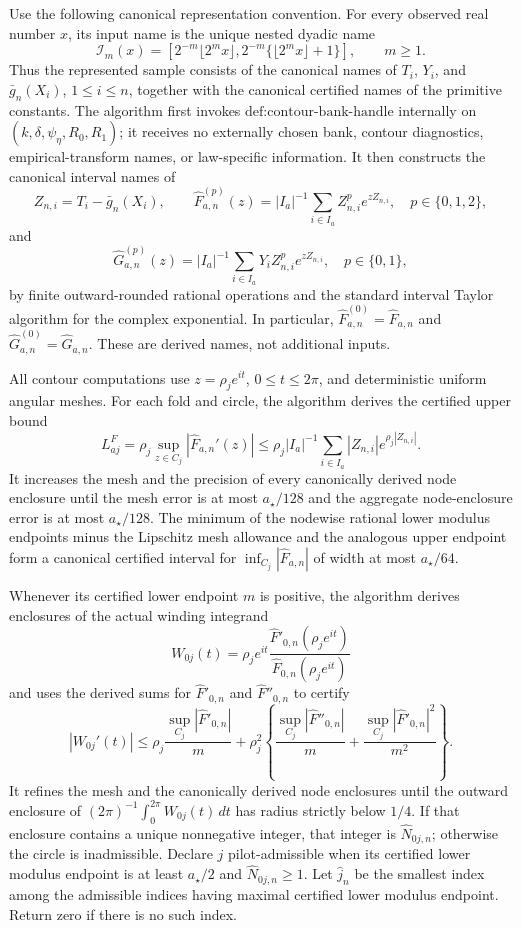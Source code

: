 Use the following canonical representation convention.  For every observed real number \(x\), its input name is the unique nested dyadic name
\[
 \mathcal I_m(x)=
 \left[2^{-m}\lfloor2^m x\rfloor,
       2^{-m}\{\lfloor2^m x\rfloor+1\}\right],
 \qquad m\ge1.
\]
Thus the represented sample consists of the canonical names of \(T_i\), \(Y_i\), and \(\bar g_n(X_i)\), \(1\le i\le n\), together with the canonical certified names of the primitive constants.  The algorithm first invokes \(\text{def:contour-bank-handle}\) internally on \((k,\delta,\psi_{\eta},R_0,R_1)\); it receives no externally chosen bank, contour diagnostics, empirical-transform names, or law-specific information.  It then constructs the canonical interval names of
\[
 Z_{n,i}=T_i-\bar g_n(X_i),
 \qquad
 \widehat F_{a,n}^{(p)}(z)
 =|I_a|^{-1}\sum_{i\in I_a}Z_{n,i}^{p}e^{zZ_{n,i}},
 \quad p\in\{0,1,2\},
\]
and
\[
 \widehat G_{a,n}^{(p)}(z)
 =|I_a|^{-1}\sum_{i\in I_a}Y_iZ_{n,i}^{p}e^{zZ_{n,i}},
 \quad p\in\{0,1\},
\]
by finite outward-rounded rational operations and the standard interval Taylor algorithm for the complex exponential.  In particular, \(\widehat F_{a,n}^{(0)}=\widehat F_{a,n}\) and \(\widehat G_{a,n}^{(0)}=\widehat G_{a,n}\).  These are derived names, not additional inputs.

All contour computations use \(z=\rho_je^{it}\), \(0\le t\le2\pi\), and deterministic uniform angular meshes.  For each fold and circle, the algorithm derives the certified upper bound
\[
 L^F_{aj}=\rho_j\sup_{z\in C_j}|\widehat F_{a,n}'(z)|
 \le \rho_j|I_a|^{-1}\sum_{i\in I_a}|Z_{n,i}|e^{\rho_j|Z_{n,i}|}.
\]
It increases the mesh and the precision of every canonically derived node enclosure until the mesh error is at most \(a_{\star}/128\) and the aggregate node-enclosure error is at most \(a_{\star}/128\).  The minimum of the nodewise rational lower modulus endpoints minus the Lipschitz mesh allowance and the analogous upper endpoint form a canonical certified interval for \(\inf_{C_j}|\widehat F_{a,n}|\) of width at most \(a_{\star}/64\).

Whenever its certified lower endpoint \(m\) is positive, the algorithm derives enclosures of the actual winding integrand
\[
 W_{0j}(t)=
 \rho_je^{it}
 \frac{\widehat F'_{0,n}(\rho_je^{it})}
      {\widehat F_{0,n}(\rho_je^{it})}
\]
and uses the derived sums for \(\widehat F'_{0,n}\) and \(\widehat F''_{0,n}\) to certify
\[
 |W_{0j}'(t)|\le
 \rho_j\frac{\sup_{C_j}|\widehat F'_{0,n}|}{m}
 +\rho_j^2\left\{
 \frac{\sup_{C_j}|\widehat F''_{0,n}|}{m}
 +\frac{\sup_{C_j}|\widehat F'_{0,n}|^2}{m^2}
 \right\}.
\]
It refines the mesh and the canonically derived node enclosures until the outward enclosure of \((2\pi)^{-1}\int_0^{2\pi}W_{0j}(t)\,dt\) has radius strictly below \(1/4\).  If that enclosure contains a unique nonnegative integer, that integer is \(\widehat N_{0j,n}\); otherwise the circle is inadmissible.  Declare \(j\) pilot-admissible when its certified lower modulus endpoint is at least \(a_{\star}/2\) and \(\widehat N_{0j,n}\ge1\).  Let \(\widehat j_n\) be the smallest index among the admissible indices having maximal certified lower modulus endpoint.  Return zero if there is no such index.

